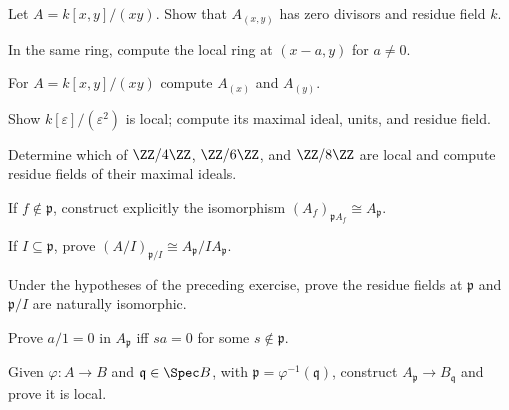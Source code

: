 \begin{exercise}
Let $A=k[x,y]/(xy)$.  Show that $A_{(x,y)}$ has zero divisors and residue field $k$.
\end{exercise}

\begin{exercise}
In the same ring, compute the local ring at $(x-a,y)$ for $a\neq0$.
\end{exercise}

\begin{exercise}
For $A=k[x,y]/(xy)$ compute $A_{(x)}$ and $A_{(y)}$.
\end{exercise}

\begin{exercise}
Show $k[\varepsilon]/(\varepsilon^2)$ is local; compute its maximal ideal, units, and residue field.
\end{exercise}

\begin{exercise}
Determine which of $\ZZ/4\ZZ$, $\ZZ/6\ZZ$, and $\ZZ/8\ZZ$ are local and compute residue fields of their maximal ideals.
\end{exercise}

\begin{exercise}
If $f\notin\mathfrak p$, construct explicitly the isomorphism $(A_f)_{\mathfrak pA_f}\cong A_{\mathfrak p}$.
\end{exercise}

\begin{exercise}
If $I\subseteq\mathfrak p$, prove $(A/I)_{\mathfrak p/I}\cong A_{\mathfrak p}/IA_{\mathfrak p}$.
\end{exercise}

\begin{exercise}
Under the hypotheses of the preceding exercise, prove the residue fields at $\mathfrak p$ and $\mathfrak p/I$ are naturally isomorphic.
\end{exercise}

\begin{exercise}
Prove $a/1=0$ in $A_{\mathfrak p}$ iff $sa=0$ for some $s\notin\mathfrak p$.
\end{exercise}

\begin{exercise}
Given $\varphi:A\to B$ and $\mathfrak q\in\Spec B$, with $\mathfrak p=\varphi^{-1}(\mathfrak q)$, construct $A_{\mathfrak p}\to B_{\mathfrak q}$ and prove it is local.
\end{exercise}

